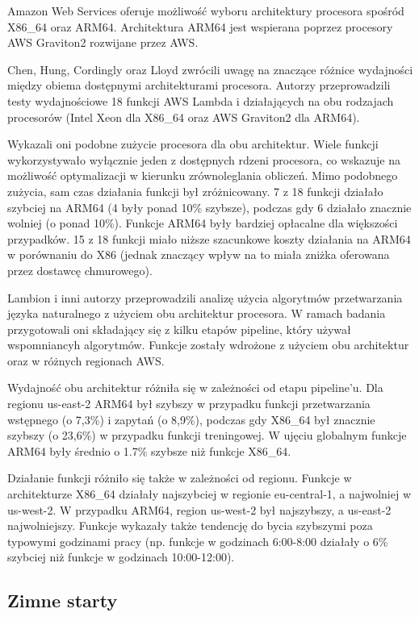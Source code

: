 Amazon Web Services oferuje możliwość wyboru architektury procesora spośród X86\_64 oraz ARM64. Architektura ARM64 jest wspierana poprzez procesory AWS Graviton2 rozwijane przez AWS.

Chen, Hung, Cordingly oraz Lloyd \cite{10.1145/3631295.3631394} zwrócili uwagę na znaczące różnice wydajności między obiema dostępnymi architekturami procesora. Autorzy przeprowadzili testy wydajnościowe 18 funkcji AWS Lambda i działających na obu rodzajach procesorów (Intel Xeon dla X86\_64 oraz AWS Graviton2 dla ARM64). 

Wykazali oni podobne zużycie procesora dla obu architektur. Wiele funkcji wykorzystywało wyłącznie jeden z dostępnych rdzeni procesora, co wskazuje na możliwość optymalizacji w kierunku zrównoleglania obliczeń. 
Mimo podobnego zużycia, sam czas działania funkcji był zróżnicowany. 
7 z 18 funkcji działało szybciej na ARM64 (4 były ponad 10\% szybsze), podczas gdy 6 działało znacznie wolniej (o ponad 10\%). 
Funkcje ARM64 były bardziej opłacalne dla większości przypadków. 15 z 18 funkcji miało niższe szacunkowe koszty działania na ARM64 w porównaniu do X86 (jednak znaczący wpływ na to miała zniżka oferowana przez dostawcę chmurowego).

Lambion i inni autorzy \cite{10.1145/3491204.3543506} przeprowadzili analizę użycia algorytmów przetwarzania języka naturalnego z użyciem obu architektur procesora. W ramach badania przygotowali oni składający się z kilku etapów pipeline, który używał wspomniancyh algorytmów. Funkcje zostały wdrożone z użyciem obu architektur oraz w różnych regionach AWS.

Wydajność obu architektur różniła się w zależności od etapu pipeline’u. Dla regionu us-east-2 ARM64 był szybszy w przypadku funkcji przetwarzania wstępnego (o 7,3\%) i zapytań (o 8,9\%), podczas gdy X86\_64 był znacznie szybszy (o 23,6\%) w przypadku funkcji treningowej. W ujęciu globalnym funkcje ARM64 były średnio o 1.7\% szybsze niż funkcje X86\_64.

Działanie funkcji różniło się także w zależności od regionu. Funkcje w architekturze X86\_64 działały najszybciej w regionie eu-central-1, a najwolniej w us-west-2. W przypadku ARM64, region us-west-2 był najszybszy, a us-east-2 najwolniejszy. Funkcje wykazały także tendencję do bycia szybszymi poza typowymi godzinami pracy (np. funkcje w godzinach 6:00-8:00 działały o 6\% szybciej niż funkcje w godzinach 10:00-12:00).

\subsection*{Zimne starty}

